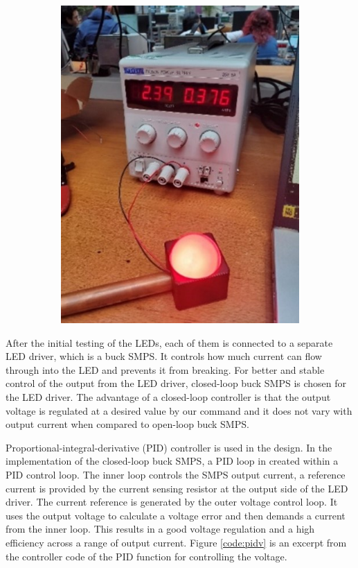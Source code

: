 \begin{figure}
\begin{subfigure}[b]{.45\linewidth}
        \includegraphics[width=\linewidth]{images/led-red.jpg}
    \end{subfigure}
\end{figure}

After the initial testing of the LEDs, each of them is connected to a separate LED driver, which is a buck SMPS. It controls how much current can flow through into the LED and prevents it from breaking. For better and stable control of the output from the LED driver, closed-loop buck SMPS is chosen for the LED driver. The advantage of a closed-loop controller is that the output voltage is regulated at a desired value by our command and it does not vary with output current when compared to open-loop buck SMPS.

Proportional-integral-derivative (PID) controller is used in the design. In the implementation of the closed-loop buck SMPS, a PID loop in created within a PID control loop. The inner loop controls the SMPS output current, a reference current is provided by the current sensing resistor at the output side of the LED driver. The current reference is generated by the outer voltage control loop. It uses the output voltage to calculate a voltage error and then demands a current from the inner loop. This results in a good voltage regulation and a high efficiency across a range of output current. Figure \ref{code:pidv} is an excerpt from the controller code of the PID function for controlling the voltage.

